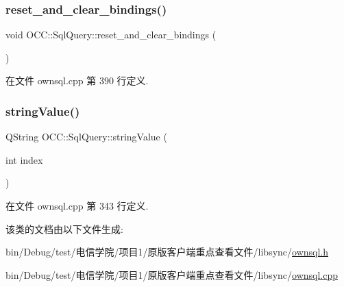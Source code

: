 \mbox{\label{class_o_c_c_1_1_sql_query_ac7e55aac44cddb1e9f1a368163be5c8a}} 
\subsubsection{\texorpdfstring{reset\+\_\+and\+\_\+clear\+\_\+bindings()}{reset\_and\_clear\_bindings()}}
{\footnotesize\ttfamily void O\+C\+C\+::\+Sql\+Query\+::reset\+\_\+and\+\_\+clear\+\_\+bindings (\begin{DoxyParamCaption}{ }\end{DoxyParamCaption})}



在文件 ownsql.\+cpp 第 390 行定义.

\mbox{\label{class_o_c_c_1_1_sql_query_a2348e2dbd9510af10d1033a7f6b509f9}} 
\subsubsection{\texorpdfstring{string\+Value()}{stringValue()}}
{\footnotesize\ttfamily Q\+String O\+C\+C\+::\+Sql\+Query\+::string\+Value (\begin{DoxyParamCaption}\item[{int}]{index }\end{DoxyParamCaption})}



在文件 ownsql.\+cpp 第 343 行定义.



该类的文档由以下文件生成\+:\begin{DoxyCompactItemize}
\item 
bin/\+Debug/test/电信学院/项目1/原版客户端重点查看文件/libsync/\hyperlink{ownsql_8h}{ownsql.\+h}\item 
bin/\+Debug/test/电信学院/项目1/原版客户端重点查看文件/libsync/\hyperlink{ownsql_8cpp}{ownsql.\+cpp}\end{DoxyCompactItemize}
